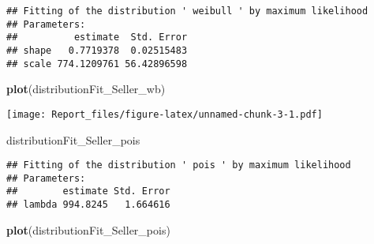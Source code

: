 \documentclass[]{article}
\newenvironment{Shaded}{\begin{snugshade}}{\end{snugshade}}
\newcommand{\KeywordTok}[1]{\textcolor[rgb]{0.13,0.29,0.53}{\textbf{#1}}}
\newcommand{\DataTypeTok}[1]{\textcolor[rgb]{0.13,0.29,0.53}{#1}}
\newcommand{\StringTok}[1]{\textcolor[rgb]{0.31,0.60,0.02}{#1}}
\newcommand{\OperatorTok}[1]{\textcolor[rgb]{0.81,0.36,0.00}{\textbf{#1}}}
\newcommand{\NormalTok}[1]{#1}
\begin{document}
\begin{Shaded}
\end{Shaded}

\begin{verbatim}
## Fitting of the distribution ' weibull ' by maximum likelihood 
## Parameters:
##          estimate  Std. Error
## shape   0.7719378  0.02515483
## scale 774.1209761 56.42896598
\end{verbatim}

\begin{Shaded}
\begin{Highlighting}[]
\KeywordTok{plot}\NormalTok{(distributionFit_Seller_wb)}
\end{Highlighting}
\end{Shaded}

\texttt{[image: Report\_files/figure-latex/unnamed-chunk-3-1.pdf]}

\begin{Shaded}
\begin{Highlighting}[]
\NormalTok{distributionFit_Seller_pois}
\end{Highlighting}
\end{Shaded}

\begin{verbatim}
## Fitting of the distribution ' pois ' by maximum likelihood 
## Parameters:
##        estimate Std. Error
## lambda 994.8245   1.664616
\end{verbatim}

\begin{Shaded}
\begin{Highlighting}[]
\KeywordTok{plot}\NormalTok{(distributionFit_Seller_pois)}
\end{Highlighting}
\end{Shaded}
\end{document}
